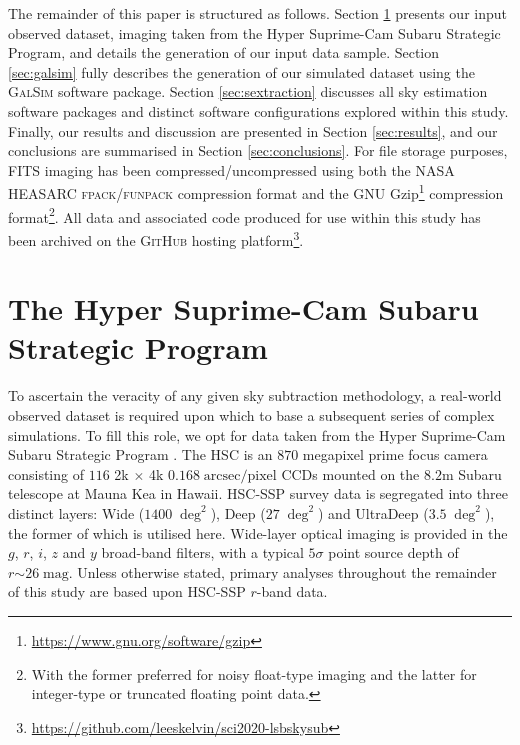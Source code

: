 \documentclass[fleqn,usenatbib,useAMS]{mnras}
\newcommand*{\about}{\mathord\sim}
\newcommand*{\GalSim}{\textsc{GalSim}\xspace}
\begin{document}
The remainder of this paper is structured as follows. Section \ref{sec:hsc} presents our input observed dataset, imaging taken from the Hyper Suprime-Cam Subaru Strategic Program, and details the generation of our input data sample. Section \ref{sec:galsim} fully describes the generation of our simulated dataset using the \GalSim software package. Section \ref{sec:sextraction} discusses all sky estimation software packages and distinct software configurations explored within this study. Finally, our results and discussion are presented in Section \ref{sec:results}, and our conclusions are summarised in Section \ref{sec:conclusions}. For file storage purposes, FITS imaging has been compressed/uncompressed using both the NASA HEASARC \textsc{fpack}/\textsc{funpack} compression format \citep{Pence2009,Pence2010} and the GNU Gzip\footnote{\url{https://www.gnu.org/software/gzip}} compression format\footnote{With the former preferred for noisy float-type imaging and the latter for integer-type or truncated floating point data.}. All data and associated code produced for use within this study has been archived on the \textsc{GitHub} hosting platform\footnote{\url{https://github.com/leeskelvin/sci2020-lsbskysub}}.

\newpage

\section{The Hyper Suprime-Cam Subaru Strategic Program}
\label{sec:hsc}

To ascertain the veracity of any given sky subtraction methodology, a real-world observed dataset is required upon which to base a subsequent series of complex simulations. To fill this role, we opt for data taken from the Hyper Suprime-Cam \citep[HSC,][]{Miyazaki2012,Miyazaki2018} Subaru Strategic Program \citep[SSP,][]{Aihara2018a}. The HSC is an $870$ megapixel prime focus camera consisting of $116$ 2k $\times$ 4k $0.168\;\mathrm{arcsec}/\mathrm{pixel}$ CCDs mounted on the $8.2\mathrm{m}$ Subaru telescope at Mauna Kea in Hawaii. HSC-SSP survey data is segregated into three distinct layers: Wide ($1400\;\deg^2$), Deep ($27\;\deg^2$) and UltraDeep ($3.5\;\deg^2$), the former of which is utilised here. Wide-layer optical imaging is provided in the $g$, $r$, $i$, $z$ and $y$ broad-band filters, with a typical $5\sigma$ point source depth of $r\about26\;\mathrm{mag}$. Unless otherwise stated, primary analyses throughout the remainder of this study are based upon HSC-SSP $r$-band data. 
\end{document}

